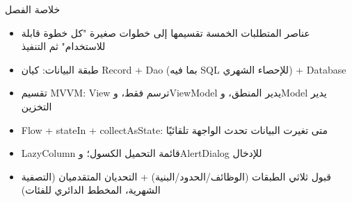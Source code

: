 \begin{tcbsummary}{خلاصة الفصل}
\begin{itemize}
  \item عناصر المتطلبات الخمسة تقسيمها إلى خطوات صغيرة "كل خطوة قابلة للاستخدام" ثم التنفيذ
  \item طبقة البيانات: كيان Record + Dao (بما فيه SQL للإحصاء الشهري) + Database
  \item تقسيم MVVM: View ترسم فقط، وViewModel يدير المنطق، وModel يدير التخزين
  \item Flow + stateIn + collectAsState: متى تغيرت البيانات تحدث الواجهة تلقائيًا
  \item LazyColumn قائمة التحميل الكسول؛ وAlertDialog للإدخال
  \item قبول ثلاثي الطبقات (الوظائف/الحدود/البنية) + التحديان المتقدميان (التصفية الشهرية، المخطط الدائري للفئات)
\end{itemize}

\end{tcbsummary}
